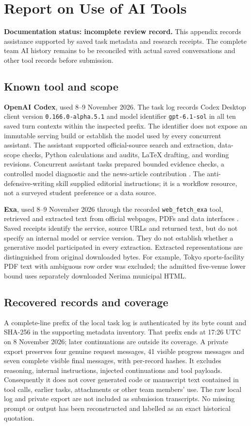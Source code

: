 \section*{Report on Use of AI Tools}
\textbf{Documentation status: incomplete review record.}
This appendix records assistance supported by saved task metadata and research
receipts. The complete team AI history remains to be reconciled with actual
saved conversations and other tool records before submission.

\subsection*{Known tool and scope}
\textbf{OpenAI Codex}, used 8--9 November 2026. The task log records Codex
Desktop client version \texttt{0.166.0-alpha.5.1} and model identifier
\texttt{gpt-6.1-sol} in all ten saved turn contexts within the inspected prefix.
The identifier does not expose an immutable serving build or establish the
model used by every concurrent assistant. The assistant supported official-source
search and extraction, data-scope checks, Python calculations and audits,
LaTeX drafting, and wording revisions. Concurrent assistant tasks prepared
bounded evidence checks, a controlled model diagnostic and the news-article
contribution \cite{openai}. The anti-defensive-writing skill supplied editorial instructions;
it is a workflow resource, not a surveyed student preference or a data source.

\textbf{Exa}, used 8--9 November 2026 through the recorded
\texttt{web\_fetch\_exa} tool, retrieved and extracted text from official
webpages, PDFs and data interfaces \cite{exa}. Saved receipts identify the
service, source URLs and returned text, but do not specify an internal model
or service version. They do not establish whether a generative model
participated in every extraction. Extracted representations are distinguished
from original downloaded bytes. For example, Tokyo sports-facility PDF text
with ambiguous row order was excluded; the admitted five-venue lower bound
uses separately downloaded Nerima municipal HTML.

\clearpage
\subsection*{Recovered records and coverage}
A complete-line prefix of the local task log is authenticated by its byte count
and SHA-256 in the supporting metadata inventory. That prefix ends at
17:26 UTC on 8 November 2026; later continuations are outside its coverage.
A private export preserves
four genuine request messages, 41 visible progress messages and seven complete
visible final messages, with per-record hashes. It excludes reasoning, internal
instructions, injected continuations and tool payloads. Consequently it does
not cover generated code or manuscript text contained in tool calls, earlier
tasks, attachments or other team members' use. The raw local log and private
export are not included as submission transcripts. No missing prompt or output
has been reconstructed and labelled as an exact historical quotation.

